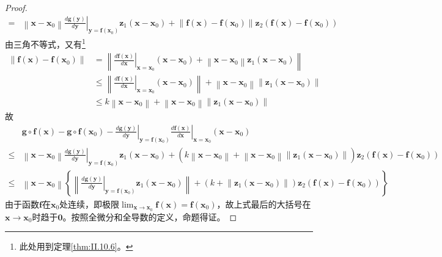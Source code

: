\documentclass[main.tex]{subfiles}
\begin{document}
\begin{proof}
\begin{align*}
=&\left\|\mathbf{x}-\mathbf{x}_0\right\|\left.\frac{d\mathbf{g}\left(\mathbf{y}\right)}{d\mathbf{y}}\right|_{\mathbf{y}=\mathbf{f}\left(\mathbf{x}_0\right)}\mathbf{z}_1\left(\mathbf{x}-\mathbf{x}_0\right)+\left\|\mathbf{f}\left(\mathbf{x}\right)-\mathbf{f}\left(\mathbf{x}_0\right)\right\|\mathbf{z}_2\left(\mathbf{f}\left(\mathbf{x}\right)-\mathbf{f}\left(\mathbf{x}_0\right)\right)
\end{align*}
由三角不等式，又有\footnote{
此处用到定理\ref{thm:II.10.6}。
}
\begin{align*}
    \left\|\mathbf{f}\left(\mathbf{x}\right)-\mathbf{f}\left(\mathbf{x}_0\right)\right\|&=\left\|\left.\frac{d\mathbf{f}\left(\mathbf{x}\right)}{d\mathbf{x}}\right|_{\mathbf{x}=\mathbf{x}_0}\left(\mathbf{x}-\mathbf{x}_0\right)+\left\|\mathbf{x}-\mathbf{x}_0\right\|\mathbf{z}_1\left(\mathbf{x}-\mathbf{x}_0\right)\right\|\\
    &\leq \left\|\left.\frac{d\mathbf{f}\left(\mathbf{x}\right)}{d\mathbf{x}}\right|_{\mathbf{x}=\mathbf{x}_0}\left(\mathbf{x}-\mathbf{x}_0\right)\right\|+\left\|\mathbf{x}-\mathbf{x}_0\right\|\left\|\mathbf{z}_1\left(\mathbf{x}-\mathbf{x}_0\right)\right\|\\
    &\leq k\left\|\mathbf{x}-\mathbf{x}_0\right\|+\left\|\mathbf{x}-\mathbf{x}_0\right\|\left\|\mathbf{z}_1\left(\mathbf{x}-\mathbf{x}_0\right)\right\|
\end{align*}
故
\begin{align*}
    &\mathbf{g}\circ\mathbf{f}\left(\mathbf{x}\right)-\mathbf{g}\circ\mathbf{f}\left(\mathbf{x}_0\right)-\left.\frac{d\mathbf{g}\left(\mathbf{y}\right)}{d\mathbf{y}}\right|_{\mathbf{y}=\mathbf{f}\left(\mathbf{x}_0\right)}\left.\frac{d\mathbf{f}\left(\mathbf{x}\right)}{d\mathbf{x}}\right|_{\mathbf{x}=\mathbf{x}_0}\left(\mathbf{x}-\mathbf{x}_0\right)\\
    \leq&\left\|\mathbf{x}-\mathbf{x}_0\right\|\left.\frac{d\mathbf{g}\left(\mathbf{y}\right)}{d\mathbf{y}}\right|_{\mathbf{y}=\mathbf{f}\left(\mathbf{x}_0\right)}\mathbf{z}_1\left(\mathbf{x}-\mathbf{x}_0\right)+\left(k\left\|\mathbf{x}-\mathbf{x}_0\right\|+\left\|\mathbf{x}-\mathbf{x}_0\right\|\left\|\mathbf{z}_1\left(\mathbf{x}-\mathbf{x}_0\right)\right\|\right)\mathbf{z}_2\left(\mathbf{f}\left(\mathbf{x}\right)-\mathbf{f}\left(\mathbf{x}_0\right)\right)\\
    \leq&\left\|\mathbf{x}-\mathbf{x}_0\right\|\left\{\left\|\left.\frac{d\mathbf{g}\left(\mathbf{y}\right)}{d\mathbf{y}}\right|_{\mathbf{y}=\mathbf{f}\left(\mathbf{x}_0\right)}\mathbf{z}_1\left(\mathbf{x}-\mathbf{x}_0\right)\right\|+\left(k+\left\|\mathbf{z}_1\left(\mathbf{x}-\mathbf{x}_0\right)\right\|\right)\mathbf{z}_2\left(\mathbf{f}\left(\mathbf{x}\right)-\mathbf{f}\left(\mathbf{x}_0\right)\right)\right\}
\end{align*}
由于函数$\mathbf{f}$在$\mathbf{x}_0$处连续，即极限$\lim_{\mathbf{x}\to\mathbf{x}_0}\mathbf{f}\left(\mathbf{x}\right)=\mathbf{f}\left(\mathbf{x}_0\right)$，故上式最后的大括号在$\mathbf{x}\to\mathbf{x}_0$时趋于$\mathbf{0}$。按照全微分和全导数的定义，命题得证。
\end{proof}
\end{document}
